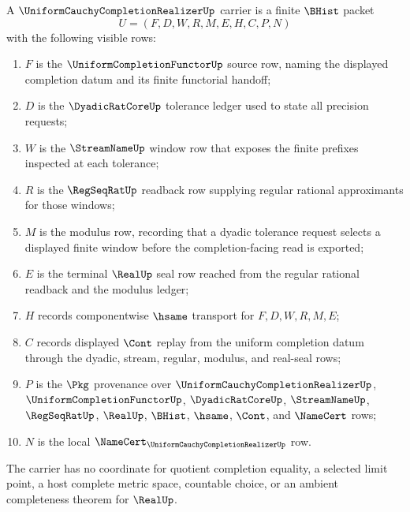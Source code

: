 \begin{definition}
\label{def:uniform-cauchy-completion-realizer-carrier}
A $\UniformCauchyCompletionRealizerUp$ carrier is a finite $\BHist$ packet
$$
U=(F,D,W,R,M,E,H,C,P,N)
$$
with the following visible rows:
\begin{enumerate}
\item $F$ is the $\UniformCompletionFunctorUp$ source row, naming the displayed completion datum and its finite functorial handoff;
\item $D$ is the $\DyadicRatCoreUp$ tolerance ledger used to state all precision requests;
\item $W$ is the $\StreamNameUp$ window row that exposes the finite prefixes inspected at each tolerance;
\item $R$ is the $\RegSeqRatUp$ readback row supplying regular rational approximants for those windows;
\item $M$ is the modulus row, recording that a dyadic tolerance request selects a displayed finite window before the completion-facing read is exported;
\item $E$ is the terminal $\RealUp$ seal row reached from the regular rational readback and the modulus ledger;
\item $H$ records componentwise $\hsame$ transport for $F,D,W,R,M,E$;
\item $C$ records displayed $\Cont$ replay from the uniform completion datum through the dyadic, stream, regular, modulus, and real-seal rows;
\item $P$ is the $\Pkg$ provenance over $\UniformCauchyCompletionRealizerUp$, $\UniformCompletionFunctorUp$, $\DyadicRatCoreUp$, $\StreamNameUp$, $\RegSeqRatUp$, $\RealUp$, $\BHist$, $\hsame$, $\Cont$, and $\NameCert$ rows;
\item $N$ is the local $\NameCert_{\UniformCauchyCompletionRealizerUp}$ row.
\end{enumerate}
The carrier has no coordinate for quotient completion equality, a selected limit point, a host complete metric space, countable choice, or an ambient completeness theorem for $\RealUp$.
\end{definition}

